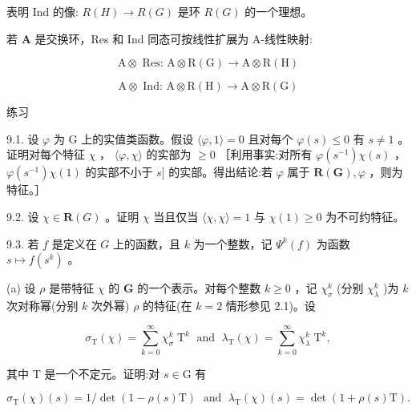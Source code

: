 \documentclass[10pt]{article}
\begin{document}
表明 Ind 的像: \(R\left( H\right)  \rightarrow  R\left( G\right)\) 是环 \(R\left( G\right)\) 的一个理想。

若 \(\mathbf{A}\) 是交换环，Res 和 Ind 同态可按线性扩展为 A-线性映射:

\[
\mathrm{A} \otimes  \text{ Res: }\mathrm{A} \otimes  \mathrm{R}\left( \mathrm{G}\right)  \rightarrow  \mathrm{A} \otimes  \mathrm{R}\left( \mathrm{H}\right)
\]

\[
\mathrm{A} \otimes  \text{ Ind: }\mathrm{A} \otimes  \mathrm{R}\left( \mathrm{H}\right)  \rightarrow  \mathrm{A} \otimes  \mathrm{R}\left( \mathrm{G}\right)
\]

练习

9.1. 设 \(\varphi\) 为 G 上的实值类函数。假设 \(\langle \varphi ,1\rangle  = 0\) 且对每个 \(\varphi \left( s\right)  \leq  0\) 有 \(s \neq  1\) 。证明对每个特征 \(\chi\) ， \(\langle \varphi ,\chi \rangle\) 的实部为 \(\geq  0\) ［利用事实:对所有 \(\varphi \left( {s}^{-1}\right) \chi \left( s\right)\) ， \(\varphi \left( {s}^{-1}\right) \chi \left( 1\right)\) 的实部不小于 \(s\rbrack\) 的实部。得出结论:若 \(\varphi\) 属于 \(\mathbf{R}\left( \mathbf{G}\right) ,\varphi\) ，则为特征。］

9.2. 设 \(\chi  \in  \mathbf{R}\left( G\right)\) 。证明 \(\chi\) 当且仅当 \(\langle \chi ,\chi \rangle  = 1\) 与 \(\chi \left( 1\right)  \geq  0\) 为不可约特征。

9.3. 若 \(f\) 是定义在 \(G\) 上的函数，且 \(k\) 为一个整数，记 \({\Psi }^{k}\left( f\right)\) 为函数 \(s \mapsto  f\left( {s}^{k}\right)\) 。

(a) 设 \(\rho\) 是带特征 \(\chi\) 的 \(\mathbf{G}\) 的一个表示。对每个整数 \(k \geq  0\) ，记 \({\chi }_{\sigma }^{k}\) (分别 \({\chi }_{\lambda }^{k}\) )为 \(k\) 次对称幂(分别 \(k\) 次外幂) \(\rho\) 的特征(在 \(k = 2\) 情形参见 2.1)。设

\[
{\sigma }_{\mathrm{T}}\left( \chi \right)  = \mathop{\sum }\limits_{{k = 0}}^{\infty }{\chi }_{\sigma }^{k}{\mathrm{\;T}}^{k}\;\text{ and }\;{\lambda }_{\mathrm{T}}\left( \chi \right)  = \mathop{\sum }\limits_{{k = 0}}^{\infty }{\chi }_{\lambda }^{k}{\mathrm{\;T}}^{k},
\]

其中 \(\mathrm{T}\) 是一个不定元。证明:对 \(s \in  \mathrm{G}\) 有

\[
{\sigma }_{\mathrm{T}}\left( \chi \right) \left( s\right)  = 1/\det \left( {1 - \rho \left( s\right) \mathrm{T}}\right) \;\text{ and }\;{\lambda }_{\mathrm{T}}\left( \chi \right) \left( s\right)  = \det \left( {1 + \rho \left( s\right) \mathrm{T}}\right) .
\]
\end{document}
